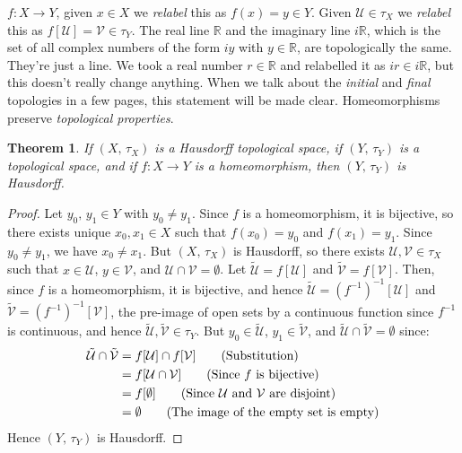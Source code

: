 \documentclass{article}
\theoremstyle{plain}
\newtheorem{theorem}{Theorem}[section]
\theoremstyle{normal}
\begin{document}
        $f:X\rightarrow{Y}$, given $x\in{X}$ we \textit{relabel} this as
        $f(x)=y\in{Y}$. Given $\mathcal{U}\in\tau_{X}$ we
        \textit{relabel} this as $f[\mathcal{U}]=\mathcal{V}\in\tau_{Y}$.
        The real line $\mathbb{R}$ and the imaginary line
        $i\mathbb{R}$, which is the set of all complex numbers of the form
        $iy$ with $y\in\mathbb{R}$, are topologically the same. They're just
        a line. We took a real number $r\in\mathbb{R}$ and relabelled it as
        $ir\in{i}\mathbb{R}$, but this doesn't really change anything.
        When we talk about the \textit{initial} and \textit{final} topologies
        in a few pages, this statement will be made clear.
        \clearpage
        Homeomorphisms preserve \textit{topological properties}.
        \begin{theorem}
            If $(X,\,\tau_{X})$ is a Hausdorff topological space, if
            $(Y,\,\tau_{Y})$ is a topological space, and if $f:X\rightarrow{Y}$
            is a homeomorphism, then $(Y,\,\tau_{Y})$ is Hausdorff.
        \end{theorem}
        \begin{proof}
            Let $y_{0},\,y_{1}\in{Y}$ with $y_{0}\ne{y}_{1}$. Since $f$ is a
            homeomorphism, it is bijective, so there exists unique
            $x_{0},x_{1}\in{X}$ such that $f(x_{0})=y_{0}$ and
            $f(x_{1})=y_{1}$. Since $y_{0}\ne{y}_{1}$, we have
            $x_{0}\ne{x}_{1}$. But $(X,\,\tau_{X})$ is Hausdorff, so there
            exists $\mathcal{U},\mathcal{V}\in\tau_{X}$ such that
            $x\in\mathcal{U}$, $y\in\mathcal{V}$, and
            $\mathcal{U}\cap\mathcal{V}=\emptyset$. Let
            $\tilde{\mathcal{U}}=f[\mathcal{U}]$ and
            $\tilde{\mathcal{V}}=f[\mathcal{V}]$. Then, since $f$ is a
            homeomorphism, it is bijective, and hence
            $\tilde{\mathcal{U}}=(f^{-1})^{-1}[\mathcal{U}]$ and
            $\tilde{\mathcal{V}}=(f^{-1})^{-1}[\mathcal{V}]$, the pre-image of
            open sets by a continuous function since $f^{-1}$ is continuous,
            and hence $\tilde{\mathcal{U}},\tilde{\mathcal{V}}\in\tau_{Y}$. But
            $y_{0}\in\tilde{\mathcal{U}}$, $y_{1}\in\tilde{\mathcal{V}}$, and
            $\tilde{\mathcal{U}}\cap\tilde{\mathcal{V}}=\emptyset$ since:
            \begin{align}
                \tilde{\mathcal{U}}\cap\tilde{\mathcal{V}}
                &=f[\mathcal{U}]\cap{f}[\mathcal{V}]\tag{Substitution}\\
                &=f[\mathcal{U}\cap\mathcal{V}]\tag{Since $f$ is bijective}\\
                &=f[\emptyset]
                    \tag{Since $\mathcal{U}$ and $\mathcal{V}$ are disjoint}\\
                &=\emptyset\tag{The image of the empty set is empty}
            \end{align}
            Hence $(Y,\,\tau_{Y})$ is Hausdorff.
        \end{proof}
\end{document}

